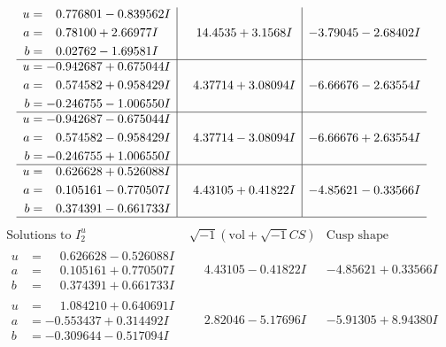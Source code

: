 \documentclass[1p]{elsarticle_modified}
\theoremstyle{definition}
\newcommand{\I}{\sqrt{-1}}
\begin{document}
$$\begin{array}{c|c|c}
\begin{aligned}
u &= \phantom{-}0.776801 - 0.839562 I \\
a &= \phantom{-}0.78100 + 2.66977 I \\
b &= \phantom{-}0.02762 - 1.69581 I\end{aligned}
 & \phantom{-}14.4535 + 3.1568 I & -3.79045 - 2.68402 I \\ \hline\begin{aligned}
u &= -0.942687 + 0.675044 I \\
a &= \phantom{-}0.574582 + 0.958429 I \\
b &= -0.246755 - 1.006550 I\end{aligned}
 & \phantom{-}4.37714 + 3.08094 I & -6.66676 - 2.63554 I \\ \hline\begin{aligned}
u &= -0.942687 - 0.675044 I \\
a &= \phantom{-}0.574582 - 0.958429 I \\
b &= -0.246755 + 1.006550 I\end{aligned}
 & \phantom{-}4.37714 - 3.08094 I & -6.66676 + 2.63554 I \\ \hline\begin{aligned}
u &= \phantom{-}0.626628 + 0.526088 I \\
a &= \phantom{-}0.105161 - 0.770507 I \\
b &= \phantom{-}0.374391 - 0.661733 I\end{aligned}
 & \phantom{-}4.43105 + 0.41822 I & -4.85621 - 0.33566 I\\
 \hline 
 \end{array}$$\newpage$$\begin{array}{c|c|c}  
\text{Solutions to }I^u_{2}& \I (\text{vol} + \sqrt{-1}CS) & \text{Cusp shape}\\
 \hline 
\begin{aligned}
u &= \phantom{-}0.626628 - 0.526088 I \\
a &= \phantom{-}0.105161 + 0.770507 I \\
b &= \phantom{-}0.374391 + 0.661733 I\end{aligned}
 & \phantom{-}4.43105 - 0.41822 I & -4.85621 + 0.33566 I \\ \hline\begin{aligned}
u &= \phantom{-}1.084210 + 0.640691 I \\
a &= -0.553437 + 0.314492 I \\
b &= -0.309644 - 0.517094 I\end{aligned}
 & \phantom{-}2.82046 - 5.17696 I & -5.91305 + 8.94380 I \\ \hline\begin{aligned}

\end{aligned}
\end{array}$$
\end{document}
